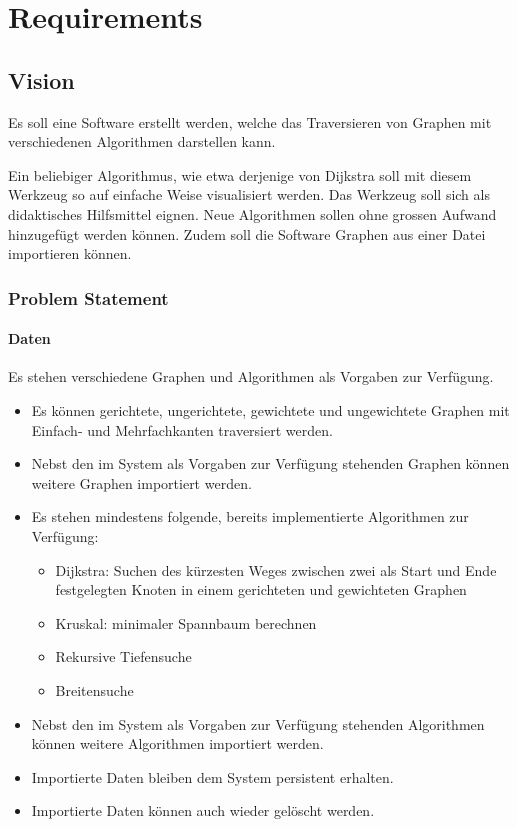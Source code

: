 \chapter{Requirements}
% 
\section{Vision}
\label{sec:Vision}
Es soll eine Software erstellt werden, welche das Traversieren von Graphen mit verschiedenen Algorithmen darstellen kann. 

Ein beliebiger Algorithmus, wie etwa derjenige von Dijkstra soll mit diesem Werkzeug so auf einfache Weise visualisiert werden. Das Werkzeug soll sich als didaktisches Hilfsmittel eignen. Neue Algorithmen sollen ohne grossen Aufwand hinzugef\"ugt werden k\"onnen. Zudem soll die Software Graphen aus einer Datei importieren k\"onnen.
% 
\subsection{Problem Statement}
\label{subsec:Problem Statement}
% 
\subsubsection{Daten}
\label{subsubsec:Daten}
Es stehen verschiedene Graphen und Algorithmen als Vorgaben zur Verf\"ugung.
\begin{itemize}
    \item Es k\"onnen gerichtete, ungerichtete, gewichtete und ungewichtete Graphen mit Einfach- und Mehrfachkanten traversiert werden.  
    \item Nebst den im System als Vorgaben zur Verf\"ugung stehenden Graphen k\"onnen weitere Graphen importiert werden.
    \item Es stehen mindestens folgende, bereits implementierte Algorithmen zur Verf\"ugung:
  \begin{itemize}
    \item Dijkstra: Suchen des k\"urzesten Weges zwischen zwei als Start und Ende festgelegten Knoten in einem gerichteten und gewichteten Graphen
    \item Kruskal: minimaler Spannbaum berechnen
    \item Rekursive Tiefensuche
    \item Breitensuche
  \end{itemize}
  \item Nebst den im System als Vorgaben zur Verf\"ugung stehenden Algorithmen k\"onnen weitere Algorithmen importiert werden.
  \item Importierte Daten bleiben dem System persistent erhalten.
  \item Importierte Daten k\"onnen auch wieder gel\"oscht werden.
\end{itemize}
% 
